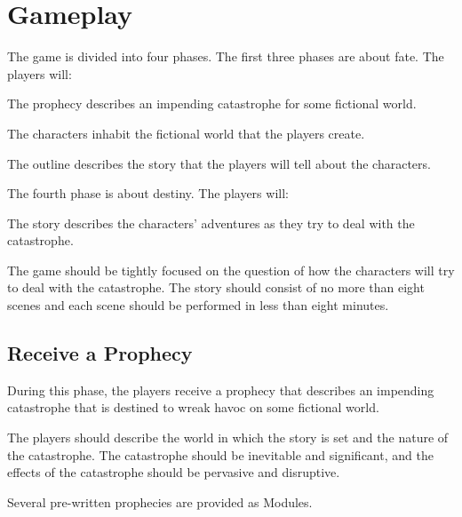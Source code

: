 \documentclass[12pt, a5paper, parskip=half-]{scrartcl}
\begin{document}
\newpage

\section*{Gameplay}
The game is divided into four phases.
The first three phases are about fate.
The players will:
\begin{description}[labelindent=0.25cm, leftmargin=\widthof{\hspace{0.25cm}\textbullet\space}, font=\normalfont\textbullet\bfseries\cinzel\small\space]
  \item[Receive a Prophecy] The prophecy describes an impending catastrophe for some fictional world.
  \item[Create Characters] The characters inhabit the fictional world that the players create.
  \item[Write an Outline] The outline describes the story that the players will tell about the characters.
\end{description}

The fourth phase is about destiny.
The players will:
\begin{description}[labelindent=0.25cm, leftmargin=\widthof{\hspace{0.25cm}\textbullet\space}, font=\normalfont\textbullet\bfseries\cinzel\small\space]
	\item[Tell the Story] The story describes the characters' adventures as they try to deal with the catastrophe.
\end{description}

\bigskip

The game should be tightly focused on the question of how the characters will try to deal with the catastrophe.
The story should consist of no more than eight scenes and each scene should be performed in less than eight minutes. 

\subsection*{Receive a Prophecy}
During this phase, the players receive a prophecy that describes an impending catastrophe that is destined to wreak havoc on some fictional world.

The players should describe the world in which the story is set and the nature of the catastrophe.
The catastrophe should be inevitable and significant, and the effects of the catastrophe should be pervasive and disruptive.

Several pre-written  prophecies are provided as {\cinzel \small Modules}.
\end{document}
